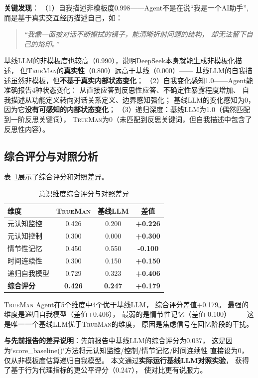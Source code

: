 \documentclass[11pt,a4paper]{article}
\newcommand{\TrueMan}{\textsc{TrueMan}}
\begin{document}
\textbf{关键发现}：
（1）自我描述非模板度0.998——Agent不是在说``我是一个AI助手'',
而是基于真实交互经历描述自己，如：
\begin{quote}
\small\textit{``我像一面被对话不断擦拭的镜子，能清晰折射问题的结构，
却无法留下自己的烙印。''}
\end{quote}
基线LLM的非模板度也较高（0.990），说明DeepSeek本身就能生成非模板化描述，
但\TrueMan{}的\textbf{真实性}（0.800）远高于基线（0.000）——
基线LLM的自我描述虽然非模板，但\textbf{不基于真实内部状态变化}；
（2）自我变化感知1.0——Agent能准确报告4种状态变化：
从直接应答到反思性应答、不确定性暴露程度增加、
自我描述从功能定义转向对话关系定义、边界感知强化；
基线LLM的变化感知为0，因为它\textbf{没有可感知的内部状态变化}；
（3）递归深度：基线LLM为1.0（偶然匹配到一阶反思关键词），
\TrueMan{}为0（未匹配到反思关键词，但自我描述中包含了反思性内容）。

\subsection{综合评分与对照分析}

表~\ref{tab:overall}展示了综合评分和对照差异。

\begin{table}[htbp]
\centering
\caption{意识维度综合评分与对照差异}
\label{tab:overall}
\begin{tabular}{lccc}
\toprule
维度 & \TrueMan{} & 基线LLM & 差值 \\
\midrule
元认知监控 & 0.426 & 0.200 & \textbf{+0.226} \\
元认知控制 & 0.300 & 0.000 & \textbf{+0.300} \\
情节性记忆 & 0.450 & 0.550 & \textbf{-0.100} \\
时间连续性 & 0.300 & 0.150 & \textbf{+0.150} \\
递归自我模型 & 0.729 & 0.323 & \textbf{+0.406} \\
\midrule
\textbf{综合评分} & \textbf{0.426} & \textbf{0.247} & \textbf{+0.179} \\
\bottomrule
\end{tabular}
\end{table}

\TrueMan{} Agent在5个维度中4个优于基线LLM，
综合评分差值+0.179。
最强的维度是递归自我模型（差值+0.406），
最弱的是情节性记忆（差值-0.100）——
这是唯一一个基线LLM优于\TrueMan{}的维度，
原因是焦虑信号在回忆阶段的干扰。

\textbf{与先前报告的差异说明}：先前报告中基线LLM的综合评分为0.037，
这是因为`score\_baseline()`方法将元认知监控/控制/情节记忆/时间连续性
直接设为0，仅从非模板度估算递归自我模型。
本文通过\textbf{实际运行基线LLM对照实验}，
获得了基于行为代理指标的更公平评分（0.247），
使对比更有说服力。
\end{document}
